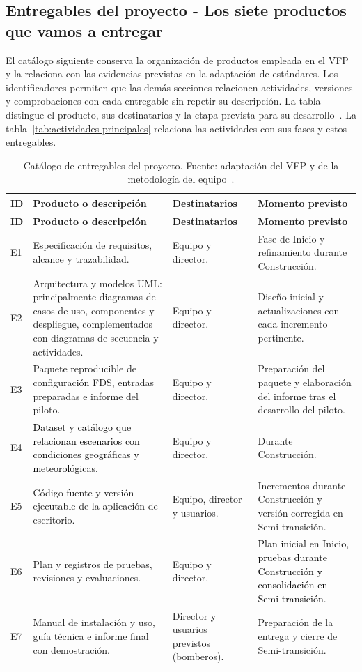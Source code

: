 
\subsection{Entregables del proyecto - Los siete productos que vamos a entregar}\label{sec:spmp-6-4}
El catálogo siguiente conserva la organización de productos empleada en el VFP y la relaciona con las evidencias previstas en la adaptación de estándares. Los identificadores permiten que las demás secciones relacionen actividades, versiones y comprobaciones con cada entregable sin repetir su descripción. La tabla distingue el producto, sus destinatarios y la etapa prevista para su desarrollo~\cite{vfp2026,adaptacion2026}. La tabla~\ref{tab:actividades-principales} relaciona las actividades con sus fases y estos entregables.
\begin{longtable}{|p{0.07\dimexpr\linewidth-8\tabcolsep-5\arrayrulewidth\relax}|p{0.44\dimexpr\linewidth-8\tabcolsep-5\arrayrulewidth\relax}|p{0.18\dimexpr\linewidth-8\tabcolsep-5\arrayrulewidth\relax}|p{0.31\dimexpr\linewidth-8\tabcolsep-5\arrayrulewidth\relax}|}
\caption{Catálogo de entregables del proyecto. Fuente: adaptación del VFP y de la metodología del equipo~\cite{vfp2026,adaptacion2026}.}\\\hline
\textbf{ID} & \textbf{Producto o descripción} & \textbf{Destinatarios} & \textbf{Momento previsto}\\\hline
\endfirsthead\hline
\textbf{ID} & \textbf{Producto o descripción} & \textbf{Destinatarios} & \textbf{Momento previsto}\\\hline
\endhead
E1 & Especificación de requisitos, alcance y trazabilidad. & Equipo y director. & Fase de Inicio y refinamiento durante Construcción.\\\hline
E2 & Arquitectura y modelos UML: principalmente diagramas de casos de uso, componentes y despliegue, complementados con diagramas de secuencia y actividades. & Equipo y director. & Diseño inicial y actualizaciones con cada incremento pertinente.\\\hline
E3 & Paquete reproducible de configuración FDS, entradas preparadas e informe del piloto. & Equipo y director. & Preparación del paquete y elaboración del informe tras el desarrollo del piloto.\\\hline
E4 & \textcolor{black}{Dataset y catálogo que relacionan escenarios con condiciones geográficas y meteorológicas.} & Equipo y director. & Durante Construcción.\\\hline
E5 & Código fuente y versión ejecutable de la aplicación de escritorio. & Equipo, director y usuarios. & Incrementos durante Construcción y versión corregida en Semi-transición.\\\hline
E6 & Plan y registros de pruebas, revisiones y evaluaciones. & Equipo y director. & \textcolor{black}{Plan inicial en Inicio, pruebas durante Construcción y consolidación en Semi-transición.}\\\hline
E7 & Manual de instalación y uso, guía técnica e informe final con demostración. & Director y usuarios previstos (bomberos). & Preparación de la entrega y cierre de Semi-transición.\\\hline
\end{longtable}

